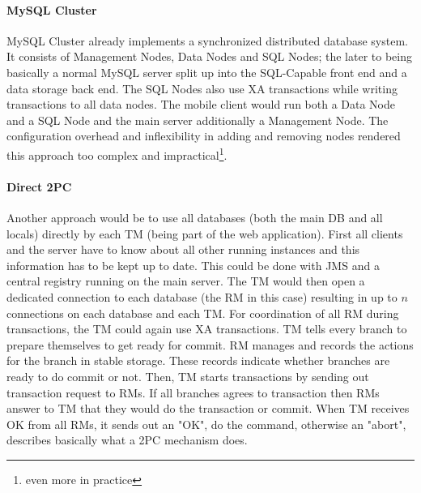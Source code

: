 \documentclass[twoside,colorbacktitle,accentcolor=tud1b]{tudexercise}
\begin{document}
\paragraph{MySQL Cluster}
MySQL Cluster already implements a synchronized distributed database system.
It consists of Management Nodes, Data Nodes and SQL Nodes; the later to being basically a normal MySQL server split up into the SQL-Capable front end and a data storage back end.
The SQL Nodes also use \ac{XA} transactions while writing transactions to all data nodes.
The mobile client would run both a Data Node and a SQL Node and the main server additionally a Management Node. The configuration overhead and inflexibility in adding and removing nodes rendered this approach too complex and impractical\footnote{even more in practice}.

\paragraph{Direct 2PC}
Another approach would be to use all databases (both the main DB and all locals) directly by each \ac{TM} (being part of the web application).
First all clients and the server have to know about all other running instances and this information has to be kept up to date.
This could be done with \ac{JMS} and a central registry running on the main server.
The \ac{TM} would then open a dedicated connection to each database (the \ac{RM} in this case) resulting in up to $n$ connections on each database and each \ac{TM}.
For coordination of all \ac{RM} during transactions, the \ac{TM} could again use \ac{XA} transactions.
TM tells every branch to prepare themselves to get ready for commit. RM manages and records the actions for the branch in stable storage. These records indicate whether branches are ready to do commit or not. Then, TM starts transactions by sending out transaction request to RMs. If all branches agrees to transaction then RMs answer to TM that they would do the transaction or commit. When TM receives OK from all RMs, it sends out an "OK", do the command, otherwise an "abort", describes basically what a 2PC mechanism does.
\end{document}
